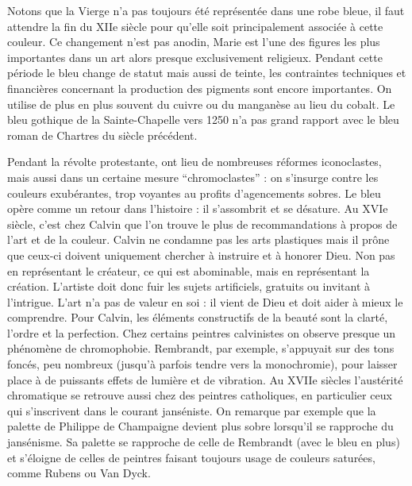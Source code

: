 \xspace
	Notons que la Vierge n'a pas toujours été représentée dans une robe bleue, il faut attendre la fin du XIIe siècle pour qu'elle soit principalement associée à cette couleur. Ce changement n'est pas anodin, Marie est l'une des figures les plus importantes dans un art alors presque exclusivement religieux. Pendant cette période le bleu change de statut mais aussi de teinte, les contraintes techniques et financières concernant la production des pigments sont encore importantes. On utilise de plus en plus souvent du cuivre ou du manganèse au lieu du cobalt. Le bleu gothique de la Sainte-Chapelle vers 1250 n'a pas grand rapport avec le bleu roman de Chartres du siècle précédent.

\xspace
	Pendant la révolte protestante, ont lieu de nombreuses réformes iconoclastes, mais aussi dans un certaine mesure “chromoclastes” : on s'insurge contre les couleurs exubérantes, trop voyantes au profits d'agencements sobres. Le bleu opère comme un retour dans l'histoire : il s'assombrit et se désature. Au XVIe siècle, c'est chez Calvin que l'on trouve le plus de recommandations à propos de l'art et de la couleur. Calvin ne condamne pas les arts plastiques mais il prône que ceux-ci doivent uniquement chercher à instruire et à honorer Dieu. Non pas en représentant le créateur, ce qui est abominable, mais en représentant la création. L'artiste doit donc fuir les sujets artificiels, gratuits ou invitant à l'intrigue. L'art n'a pas de valeur en soi : il vient de Dieu et doit aider à mieux le comprendre. Pour Calvin, les éléments constructifs de la beauté sont la clarté, l'ordre et la perfection. Chez certains peintres calvinistes on observe presque un phénomène de chromophobie. Rembrandt, par exemple, s'appuyait sur des tons foncés, peu nombreux (jusqu'à parfois tendre vers la monochromie), pour laisser place à de puissants effets de lumière et de vibration. Au XVIIe siècles l'austérité chromatique se retrouve aussi chez des peintres catholiques, en particulier ceux qui s'inscrivent dans le courant janséniste. On remarque par exemple que la palette de Philippe de Champaigne devient plus sobre lorsqu'il se rapproche du jansénisme. Sa palette se rapproche de celle de Rembrandt (avec le bleu en plus) et s'éloigne de celles de peintres faisant toujours usage de couleurs saturées, comme Rubens ou Van Dyck.

